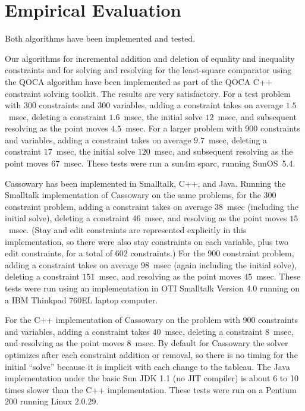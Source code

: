 \documentclass{article}
\begin{document}
\section{Empirical Evaluation}
\label{empirical-evaluation}

Both algorithms have been implemented and tested.

Our algorithms for incremental addition and deletion of equality and inequality
constraints and for solving and resolving for the least-square comparator
using the QOCA algorithm have been implemented as part of the QOCA C++
constraint solving toolkit. 
The results are very satisfactory.
For a test problem with 300 constraints and
300 variables, adding a constraint takes
on average  $1.5$~msec, deleting a constraint $1.6$~msec, the initial
solve  $12$~msec, and subsequent resolving as the point moves $4.5$~msec.
For a larger problem with 900 constraints and variables,
adding a constraint takes
on average  $9.7$~msec, deleting a constraint $17$~msec, the initial
solve  $120$~msec, and subsequent resolving as the point moves $67$~msec.
These tests were run a sun4m sparc, running SunOS~5.4.

Cassowary has been implemented in Smalltalk, C++, and Java.
Running the Smalltalk implementation of Cassowary on the same problems, 
for the 300 constraint problem,
adding a constraint takes on average $38$~msec (including the initial
solve), deleting a constraint $46$~msec, and resolving as the point moves
$15$~msec.  (Stay and edit constraints are represented explicitly in this
implementation, so there were also stay constraints on each variable, plus
two edit constraints, for a total of 602 constraints.)
For the 900 constraint problem, adding a constraint takes on
average $98$~msec (again including the initial solve), deleting a
constraint $151$~msec, and resolving as the point moves $45$~msec.  These
tests were run using an implementation in OTI Smalltalk Version 4.0 running
on a IBM Thinkpad 760EL laptop computer.

For the C++ implementation of Cassowary on the problem with 900
constraints and variables, adding a constraint takes $40$~msec, deleting 
a constraint $8$~msec, and resolving as the point moves $8$~msec.  By
default for Cassowary the solver optimizes after each constraint
addition or removal, so there is no timing for the initial ``solve''
because it is implicit with each change to the tableau.  The Java
implementation under the basic Sun JDK 1.1 (no JIT compiler) is about
6 to 10 times slower than the C++ implementation.  These tests were run
on a Pentium 200 running Linux 2.0.29.
\end{document}
